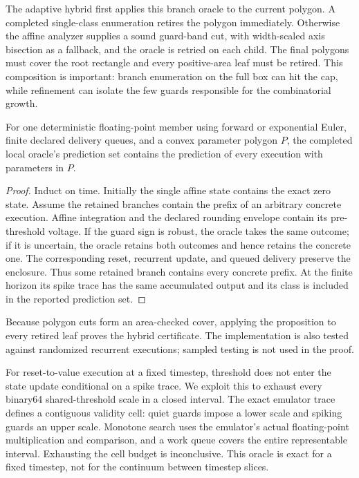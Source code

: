The adaptive hybrid first applies this branch oracle to the current polygon.  A
completed single-class enumeration retires the polygon immediately.  Otherwise
the affine analyzer supplies a sound guard-band cut, with width-scaled axis
bisection as a fallback, and the oracle is retried on each child.  The final
polygons must cover the root rectangle and every positive-area leaf must be
retired.  This composition is important: branch enumeration on the full box can
hit the cap, while refinement can isolate the few guards responsible for the
combinatorial growth.

\begin{proposition}
For one deterministic floating-point member using forward or exponential Euler,
finite declared delivery queues, and a convex parameter polygon $P$, the
completed local oracle's prediction set contains the prediction of every
execution with parameters in $P$.
\end{proposition}
\begin{proof}
Induct on time.  Initially the single affine state contains the exact zero
state.  Assume the retained branches contain the prefix of an arbitrary concrete
execution.  Affine integration and the declared rounding envelope contain its
pre-threshold voltage.  If the guard sign is robust, the oracle takes the same
outcome; if it is uncertain, the oracle retains both outcomes and hence retains
the concrete one.  The corresponding reset, recurrent update, and queued
delivery preserve the enclosure.  Thus some retained branch contains every
concrete prefix.  At the
finite horizon its spike trace has the same accumulated output and its class is
included in the reported prediction set.
\end{proof}
Because polygon cuts form an area-checked cover, applying the proposition to
every retired leaf proves the hybrid certificate.  The implementation is also
tested against randomized recurrent executions; sampled testing is not used in
the proof.

For reset-to-value execution at a fixed timestep, threshold does not enter the
state update conditional on a spike trace. We exploit this to exhaust every
binary64 shared-threshold scale in a closed interval. The exact emulator trace
defines a contiguous validity cell: quiet guards impose a lower scale and
spiking guards an upper scale. Monotone search uses the emulator's actual
floating-point multiplication and comparison, and a work queue covers the
entire representable interval. Exhausting the cell budget is inconclusive. This
oracle is exact for a fixed timestep, not for the continuum between timestep
slices.

